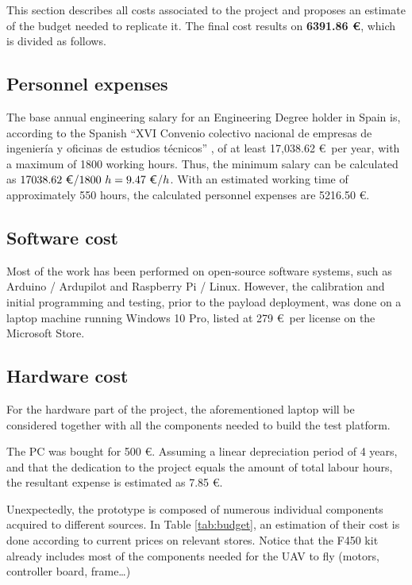 This section describes all costs associated to the project and proposes an estimate
of the budget needed to replicate it. The final cost results on \textbf{6391.86 \euro}, which is divided as follows.

\subsection{Personnel expenses}
The base annual engineering salary for an Engineering Degree holder in Spain is, according to the Spanish ``XVI Convenio colectivo nacional de empresas de ingenier\'ia y oficinas de estudios t\'ecnicos'' \cite{disposicin16097deboenm274de20112011}, of at least 17,038.62 \euro\ per year, with a maximum of 1800 working hours.
Thus, the minimum salary can be calculated as $17038.62\ \text{\euro} / 1800\ h = 9.47\ \text{\euro}/h $. With an estimated working time of approximately 550 hours, the calculated personnel expenses are 5216.50 \euro.

\subsection{Software cost}
Most of the work has been performed on open-source software systems, such as Arduino / Ardupilot and Raspberry Pi / Linux.
However, the calibration and initial programming and testing, prior to the payload deployment, was done on a laptop machine running Windows 10 Pro, listed at 279 \euro\ per license on the Microsoft Store.

\subsection{Hardware cost}
For the hardware part of the project, the aforementioned laptop will be considered together with all the components needed to build the test platform.

The PC was bought for 500 \euro. Assuming a linear depreciation period of 4 years, and that the dedication to the project equals the amount of total labour hours, the resultant expense is estimated as 7.85 \euro.

Unexpectedly, the prototype is composed of numerous individual components acquired to different sources.
In Table \ref{tab:budget}, an estimation of their cost is done according to current prices on relevant stores.
Notice that the F450 kit already includes most of the components needed for the UAV to fly (motors, controller board, frame\ldots)

